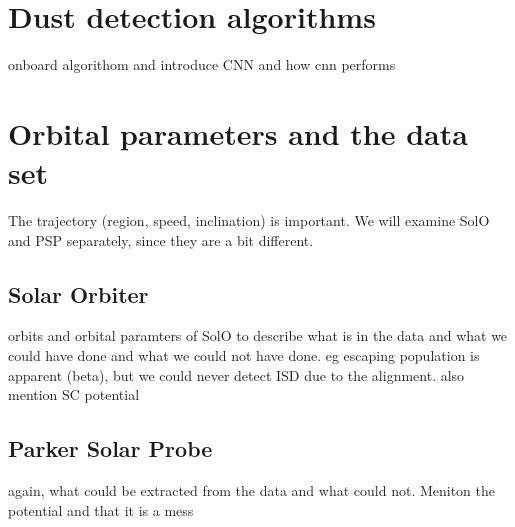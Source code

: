 \section{Dust detection algorithms}

onboard algorithom and introduce CNN and how cnn performs

\section{Orbital parameters and the data set}

The trajectory (region, speed, inclination) is important. We will examine SolO and PSP separately, since they are a bit different.

\subsection{Solar Orbiter}

orbits and orbital paramters of SolO to describe what is in the data and what we could have done and what we could not have done. eg escaping population is apparent (beta), but we could never detect ISD due to the alignment. also mention SC potential

\subsection{Parker Solar Probe}

again, what could be extracted from the data and what could not. Meniton the potential and that it is a mess












